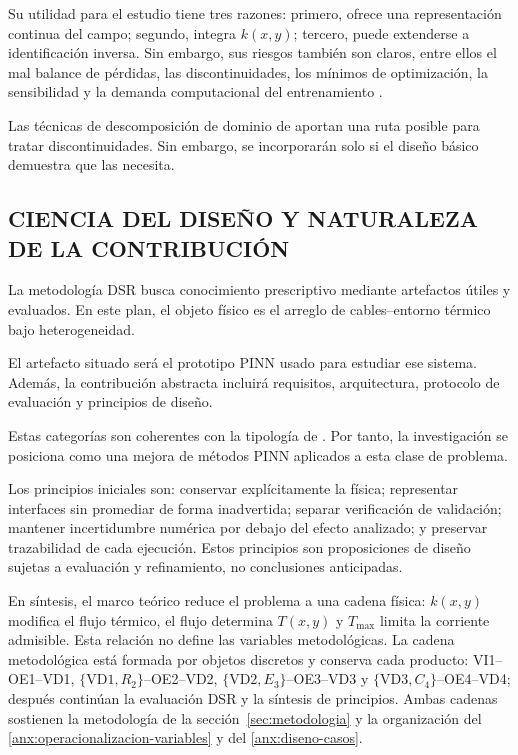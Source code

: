 \documentclass[11pt,a4paper,oneside]{report}
\newcommand{\Tmax}{T_{\max}}
\newcommand{\kx}{k(x,y)}
\begin{document}
Su utilidad para el estudio tiene tres razones: primero, ofrece una representación continua del campo; segundo, integra $\kx$; tercero, puede extenderse a identificación inversa. Sin embargo, sus riesgos también son claros, entre ellos el mal balance de pérdidas, las discontinuidades, los mínimos de optimización, la sensibilidad y la demanda computacional del entrenamiento \parencites[2--6]{ren2025}[16]{pan2025}.

Las técnicas de descomposición de dominio de \textcite[1--2]{shukla2021} aportan una ruta posible para tratar discontinuidades. Sin embargo, se incorporarán solo si el diseño básico demuestra que las necesita.

\subsection{CIENCIA DEL DISEÑO Y NATURALEZA DE LA CONTRIBUCIÓN}
\label{subsec:dsr-contribucion}

La metodología DSR busca conocimiento prescriptivo mediante artefactos útiles y evaluados. En este plan, el objeto físico es el arreglo de cables--entorno térmico bajo heterogeneidad.

El artefacto situado será el prototipo PINN usado para estudiar ese sistema. Además, la contribución abstracta incluirá requisitos, arquitectura, protocolo de evaluación y principios de diseño.

Estas categorías son coherentes con la tipología de \textcite[343--349]{gregor2013}. Por tanto, la investigación se posiciona como una mejora de métodos PINN aplicados a esta clase de problema.

Los principios iniciales son: conservar explícitamente la física; representar interfaces sin promediar de forma inadvertida; separar verificación de validación; mantener incertidumbre numérica por debajo del efecto analizado; y preservar trazabilidad de cada ejecución. Estos principios son proposiciones de diseño sujetas a evaluación y refinamiento, no conclusiones anticipadas.

En síntesis, el marco teórico reduce el problema a una cadena física: $\kx$ modifica el flujo térmico, el flujo determina $T(x,y)$ y $\Tmax$ limita la corriente admisible. Esta relación no define las variables metodológicas. La cadena metodológica está formada por objetos discretos y conserva cada producto: VI1--OE1--VD1, $\{\mathrm{VD1},R_2\}$--OE2--VD2, $\{\mathrm{VD2},E_3\}$--OE3--VD3 y $\{\mathrm{VD3},C_4\}$--OE4--VD4; después continúan la evaluación DSR y la síntesis de principios. Ambas cadenas sostienen la metodología de la sección~\ref{sec:metodologia} y la organización del \ref{anx:operacionalizacion-variables} y del \ref{anx:diseno-casos}.
\end{document}
